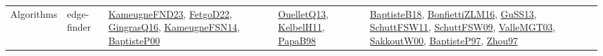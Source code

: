 {\begin{longtable}{lp{3cm}>{\raggedright}p{6cm}>{\raggedright}p{6cm}p{8cm}}
Algorithms & edge-finder & \href{papers/KameugneFND23.pdf}{KameugneFND23}\cite{KameugneFND23}, \href{articles/FetgoD22.pdf}{FetgoD22}\cite{FetgoD22}, \href{papers/GingrasQ16.pdf}{GingrasQ16}\cite{GingrasQ16}, \href{articles/KameugneFSN14.pdf}{KameugneFSN14}\cite{KameugneFSN14}, \href{articles/BaptisteP00.pdf}{BaptisteP00}\cite{BaptisteP00} & \href{papers/OuelletQ13.pdf}{OuelletQ13}\cite{OuelletQ13}, \href{articles/KelbelH11.pdf}{KelbelH11}\cite{KelbelH11}, \href{articles/PapaB98.pdf}{PapaB98}\cite{PapaB98} & \href{articles/BaptisteB18.pdf}{BaptisteB18}\cite{BaptisteB18}, \href{papers/BonfiettiZLM16.pdf}{BonfiettiZLM16}\cite{BonfiettiZLM16}, \href{papers/GuSS13.pdf}{GuSS13}\cite{GuSS13}, \href{articles/SchuttFSW11.pdf}{SchuttFSW11}\cite{SchuttFSW11}, \href{papers/SchuttFSW09.pdf}{SchuttFSW09}\cite{SchuttFSW09}, \href{papers/ValleMGT03.pdf}{ValleMGT03}\cite{ValleMGT03}, \href{articles/SakkoutW00.pdf}{SakkoutW00}\cite{SakkoutW00}, \href{papers/BaptisteP97.pdf}{BaptisteP97}\cite{BaptisteP97}, \href{articles/Zhou97.pdf}{Zhou97}\cite{Zhou97}\\

\end{longtable}}
